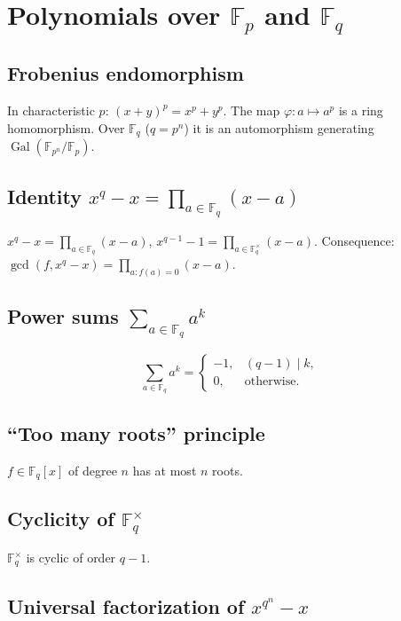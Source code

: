 \medskip

\section{Polynomials over $\mathbb{F}_p$ and $\mathbb{F}_q$}
\label{sec:polynomials-over-fq}

\subsection{Frobenius endomorphism}
\label{subsec:frobenius}

In characteristic $p$: $(x+y)^p=x^p+y^p$. The map $\varphi:a\mapsto a^p$ is a ring homomorphism. Over $\mathbb{F}_q$ ($q=p^n$) it is an automorphism generating $\operatorname{Gal}(\mathbb{F}_{p^n}/\mathbb{F}_p)$.

\subsection{Identity $x^q-x=\prod_{a\in\mathbb{F}_q}(x-a)$}
\label{subsec:xq-x}

$x^q-x=\prod_{a\in\mathbb{F}_q}(x-a)$, $x^{q-1}-1=\prod_{a\in\mathbb{F}_q^\times}(x-a)$. Consequence: $\gcd(f,x^q-x)=\prod_{a: f(a)=0}(x-a)$.

\subsection{Power sums $\sum_{a\in\mathbb{F}_q}a^k$}
\label{subsec:power-sums-fq}

$$\sum_{a\in\mathbb{F}_q}a^k=\begin{cases}-1,&(q-1)\mid k,\\0,&\text{otherwise}.\end{cases}$$

\subsection{``Too many roots'' principle}
\label{subsec:too-many-roots}

$f\in\mathbb{F}_q[x]$ of degree $n$ has at most $n$ roots.

\subsection{Cyclicity of $\mathbb{F}_q^\times$}
\label{subsec:fq-cyclic}

$\mathbb{F}_q^\times$ is cyclic of order $q-1$.

\subsection{Universal factorization of $x^{q^n}-x$}
\label{subsec:universal-factorization}

